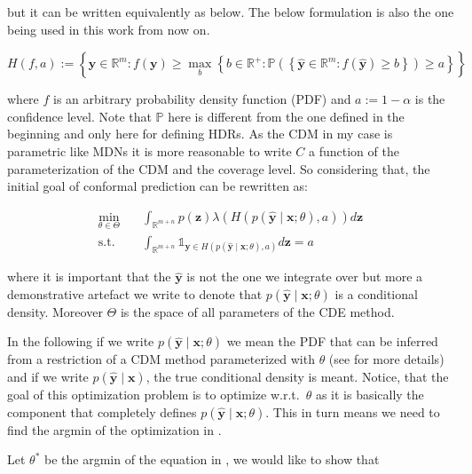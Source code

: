 but it can be written equivalently as below. The below formulation is also the one being used in this work from now on.

\begin{equation}
    H\left(f, a\right):=\left\{\mathbf{y} \in \mathbb{R}^m: f(\mathbf{y}) \geq
    \max_{b} \left\{b \in \mathbb{R^+}: \mathbb{P}\left(\left\{\mathbf{\hat{y}}
    \in
    \mathbb{R}^m: f(\mathbf{\hat{y}}) \geq b\right\}\right) \geq a
    \right\}\right\}
    \label{eq:HDR}
\end{equation}

where $f$ is an arbitrary probability density function (PDF) and $a := 1 - \alpha$ is the confidence level. Note that $\mathbb{P}$ here is different from the one defined in the beginning and only here for defining HDRs. As the CDM in my case is parametric like MDNs it is more reasonable to write $C$ a function of the parameterization of the CDM and the coverage level. So considering that, the initial goal of conformal prediction can be rewritten as:

\begin{align}
    \min_{\theta \in \Theta} \quad & \int_{\mathbb{R}^{m + n}} p(\mathbf{z})
    \lambda(H(p(\mathbf{\hat{y}} \mid \mathbf{x}; \theta), a))
    d\mathbf{z} \label{eq:optimal_cp_obj_func}
    \\
    \text{s.t.} \quad              & \int_{\mathbb{R}^{m + n}}
    \mathds{1}_{\mathbf{y} \in
    H(p(\mathbf{\hat{y}} \mid \mathbf{x}; \theta), a)} d\mathbf{z} = a
\end{align}

where it is important that the $\mathbf{\hat{y}}$ is not the one we integrate over but more a demonstrative artefact we write to denote that $p(\mathbf{\hat{y}} \mid \mathbf{x}; \theta)$ is a conditional density. Moreover $\Theta$ is the space of all parameters of the CDE method.

In the following if we write $p(\mathbf{\hat{y}} \mid \mathbf{x}; \theta)$ we mean the PDF that can be inferred from a restriction of a CDM method parameterized with $\theta$ (see  for more details) and if we write $p(\mathbf{\hat{y}} \mid \mathbf{x})$, the true conditional density is meant. Notice, that the goal of this optimization problem is to optimize w.r.t.\ $\theta$ as it is basically the component that completely defines $p(\mathbf{\hat{y}} \mid \mathbf{x}; \theta)$. This in turn means we need to find the argmin of the optimization in .

Let $\theta^*$ be the argmin of the equation in , we would like to show that


